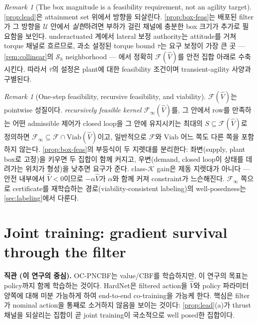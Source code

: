 \documentclass[11pt]{article}
\theoremstyle{plain}
\theoremstyle{definition}
\theoremstyle{remark}
\newtheorem{remark}[theorem]{Remark}
\newcommand{\calU}{\mathcal{U}}
\newcommand{\calK}{\mathcal{K}}
\newcommand{\Vhat}{\widehat V}
\begin{document}
\begin{remark}[The box magnitude is a feasibility requirement, not an agility target]\label{rem:box-magnitude}
\cref{prop:lead}은 attainment set 위에서 방향을 되살린다. \cref{prop:box-feas}는 배포된 filter가 그
방향을 $\calU$ 안에서 \emph{실현}하려면 부하가 걸린 채널에 충분한 box 크기가 추가로 필요함을
보인다. underactuated 계에서 lateral 보정 authority는 attitude를 거쳐 torque 채널로 흐르므로,
과소 설정된 torque bound $\overline\tau$는 요구 보정이 가장 큰 곳 --- \cref{rem:collinear}의
$\mathcal S_h$ neighborhood --- 에서 정확히 $\mathcal F(\Vhat)$를 안전 집합 아래로 수축시킨다.
따라서 $\overline\tau$의 설정은 plant에 대한 feasibility 조건이며 transient-agility 사양과
구별된다.
\end{remark}

\begin{remark}[One-step feasibility, recursive feasibility, and viability]\label{rem:viability}
$\mathcal F(\Vhat)$는 pointwise 성질이다. \emph{recursively feasible kernel}
$\mathcal F_\infty(\Vhat)$를, 그 안에서 row를 만족하는 어떤 admissible 제어가 closed loop을 그 안에
유지시키는 최대의 $S\subseteq\mathcal F(\Vhat)$로 정의하면 $\mathcal F_\infty\subseteq
\mathcal F\cap\mathrm{Viab}(\Vhat)$이고, 일반적으로 $\mathcal F$와 $\mathrm{Viab}$ 어느 쪽도 다른
쪽을 포함하지 않는다. \cref{prop:box-feas}의 부등식이 두 지렛대를 분리한다: 좌변(supply, plant
box로 고정)을 키우면 두 집합이 함께 커지고, 우변(demand, closed loop이 상태를 데려가는 위치가
형성)을 낮추면 요구가 준다. class-$\calK$ gain은 제동 지렛대가 아니다 --- 안전 내부에서
$\Vhat<0$이므로 $-\alpha\Vhat$가 $\alpha$와 함께 커져 constraint가 느슨해진다.
$\mathcal F_\infty$ 쪽으로 certificate를 재학습하는 경로(viability-consistent labeling)의
well-posedness는 \cref{sec:labeling}에서 다룬다.
\end{remark}

\section{Joint training: gradient survival through the filter}\label{sec:jt}

\textbf{직관 (이 연구의 중심).}
OC-PNCBF는 value/CBF를 학습하지만, 이 연구의 목표는 policy까지 함께 학습하는 것이다. HardNet은
filtered action을 $\Vhat$와 policy 파라미터 양쪽에 대해 미분 가능하게 하여 end-to-end
co-training을 가능케 한다. 핵심은 filter가 nominal action을 통째로 소거하지 않음을 보이는 것이다:
\cref{prop:lead}(a)가 thrust 채널을 되살리는 집합이 곧 joint training이 국소적으로 well posed한
집합이다.
\end{document}
